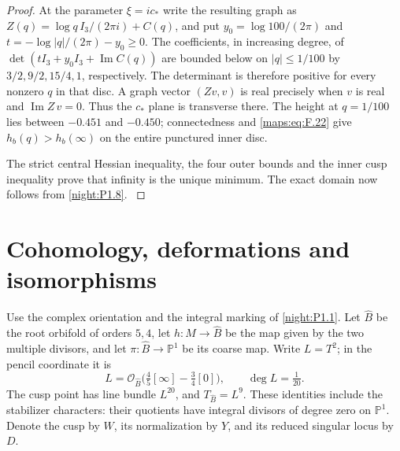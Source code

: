 \begin{proof}
At the parameter $\xi=ic_*$ write the resulting graph as
$Z(q)=\log q\,I_3/(2\pi i)+C(q)$, and put
$y_0=\log100/(2\pi)$ and $t=-\log|q|/(2\pi)-y_0\ge0$.
The coefficients, in increasing degree, of
$\det(tI_3+y_0I_3+\operatorname{Im}C(q))$ are bounded below
on $|q|\le1/100$ by
$3/2,9/2,15/4,1$, respectively.
The determinant is therefore positive for every nonzero $q$
in that disc. A graph vector $(Zv,v)$ is real precisely when
$v$ is real and $\operatorname{Im}Z\,v=0$. Thus the
$c_*$ plane is transverse there. The height at $q=1/100$
lies between $-0.451$ and $-0.450$; connectedness and
\eqref{maps:eq:F.22} give
$h_b(q)>h_b(\infty)$ on the entire punctured inner disc.

The strict central Hessian inequality, the four outer bounds and
the inner cusp inequality prove that infinity is the unique
minimum. The exact domain now follows from
\cref{night:P1.8}.
\hypertarget{tag-03L1}{}\label{layout:V:fresh-splitting}
\end{proof}


\section{Cohomology, deformations and isomorphisms}

\begin{definition}\label{def:V:root-orbifold-notation}
Use the complex orientation and the integral marking of \cref{night:P1.1}.
Let $\widehat B$ be the root orbifold of orders $5,4$, let
$h:M\to\widehat B$ be the map given by the two multiple divisors,
and let $\pi:\widehat B\to\mathbb P^1$ be its coarse map.
Write $L=T^2$; in the pencil coordinate it is
\[
 L=\mathcal O_{\widehat B}\bigl(\tfrac45[\infty]
                  -\tfrac34[0]\bigr),\qquad \deg L=\tfrac1{20}.
\]
The cusp point has line bundle $L^{20}$, and
$T_{\widehat B}=L^9$. These identities include the stabilizer
characters: their quotients have integral divisors of degree zero
on $\mathbb P^1$. Denote the cusp by $W$, its normalization by $Y$,
and its reduced singular locus by $D$.
\end{definition}

